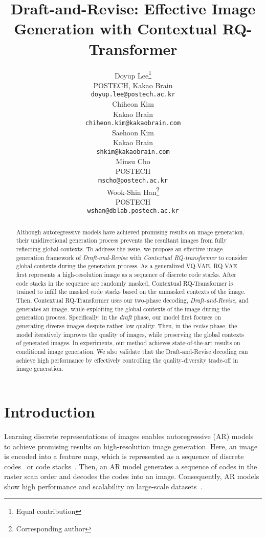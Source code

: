 \documentclass{article}
\title{Draft-and-Revise: Effective Image Generation with Contextual RQ-Transformer}
\author{Doyup Lee\thanks{Equal contribution} \\
  POSTECH, Kakao Brain\\
  \texttt{doyup.lee@postech.ac.kr} \\
  \And
  Chiheon Kim\footnotemark[1] \\
  Kakao Brain\\
  \texttt{chiheon.kim@kakaobrain.com} \\
  \And 
  Saehoon Kim\\
  Kakao Brain\\
  \texttt{shkim@kakaobrain.com}\\
  \And
  Minsu Cho\\
  POSTECH\\
  \texttt{mscho@postech.ac.kr}\\
  \And
  Wook-Shin Han\thanks{Corresponding author}\\
  POSTECH\\
  \texttt{wshan@dblab.postech.ac.kr}\\
}
\begin{document}
\maketitle


\begin{abstract}
Although autoregressive models have achieved promising results on image generation, their unidirectional generation process prevents the resultant images from fully reflecting global contexts. To address the issue, we propose an effective image generation framework of \emph{Draft-and-Revise} with \emph{Contextual RQ-transformer} to consider global contexts during the generation process. As a generalized VQ-VAE, RQ-VAE first represents a high-resolution image as a sequence of discrete code stacks. After code stacks in the sequence are randomly masked, Contextual RQ-Transformer is trained to infill the masked code stacks based on the unmasked contexts of the image. Then, Contextual RQ-Transformer uses our two-phase decoding, \emph{Draft-and-Revise}, and generates an image, while exploiting the global contexts of the image during the generation process. Specifically. in the \emph{draft} phase, our model first focuses on generating diverse images despite rather low quality. Then, in the \emph{revise} phase, the model iteratively improves the quality of images, while preserving the global contexts of generated images. In experiments, our method achieves state-of-the-art results on conditional image generation. We also validate that the Draft-and-Revise decoding can achieve high performance by effectively controlling the quality-diversity trade-off in image generation.
\end{abstract}




\section{Introduction} \label{sec:intro}


Learning discrete representations of images enables autoregressive (AR) models to achieve promising results on high-resolution image generation. 
Here, an image is encoded into a feature map, which is represented as a sequence of discrete codes~\cite{VQGAN,VQVAE} or code stacks~\cite{RQVAE}. 
Then, an AR model generates a sequence of codes in the raster scan order and decodes the codes into an image.
Consequently, AR models show high performance and scalability on large-scale datasets~\cite{VQGAN,RQVAE,DALL-E}.
\end{document}

